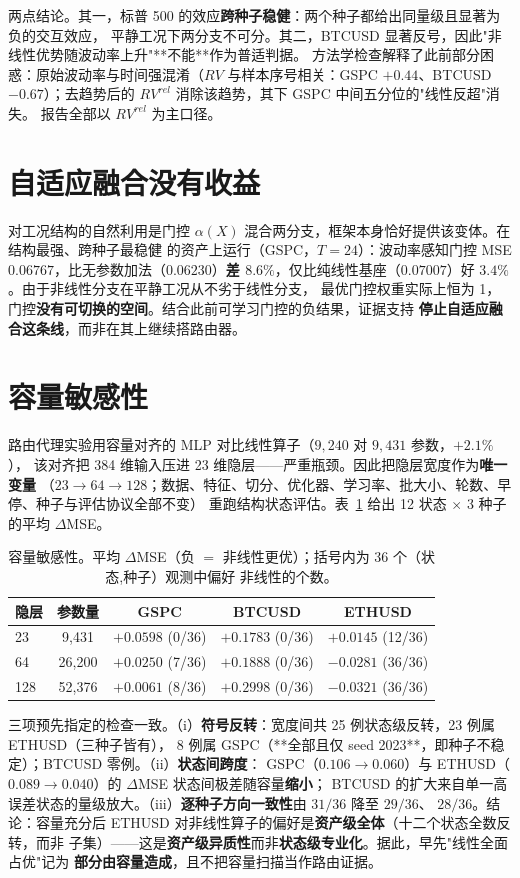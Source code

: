 \documentclass[conference]{IEEEtran}
\begin{document}
两点结论。其一，标普 500 的效应\textbf{跨种子稳健}：两个种子都给出同量级且显著为负的交互效应，
平静工况下两分支不可分。其二，BTCUSD 显著反号，因此"非线性优势随波动率上升"**不能**作为普适判据。
方法学检查解释了此前部分困惑：原始波动率与时间强混淆（$RV$ 与样本序号相关：GSPC $+0.44$、BTCUSD
$-0.67$）；去趋势后的 $RV^{rel}$ 消除该趋势，其下 GSPC 中间五分位的"线性反超"消失。
报告全部以 $RV^{rel}$ 为主口径。

\section{自适应融合没有收益}
对工况结构的自然利用是门控 $\alpha(X)$ 混合两分支，框架本身恰好提供该变体。在结构最强、跨种子最稳健
的资产上运行（GSPC，$T=24$）：波动率感知门控 MSE $0.06767$，比无参数加法（$0.06230$）\textbf{差
$8.6\%$}，仅比纯线性基座（$0.07007$）好 $3.4\%$。由于非线性分支在平静工况从不劣于线性分支，
最优门控权重实际上恒为 1，门控\textbf{没有可切换的空间}。结合此前可学习门控的负结果，证据支持
\textbf{停止自适应融合这条线}，而非在其上继续搭路由器。

\section{容量敏感性}
路由代理实验用容量对齐的 MLP 对比线性算子（$9{,}240$ 对 $9{,}431$ 参数，$+2.1\%$），
该对齐把 384 维输入压进 23 维隐层——严重瓶颈。因此把隐层宽度作为\textbf{唯一变量}
（$23\to64\to128$；数据、特征、切分、优化器、学习率、批大小、轮数、早停、种子与评估协议全部不变）
重跑结构状态评估。表~\ref{tab:cap} 给出 12 状态 $\times$ 3 种子的平均 $\Delta$MSE。

\begin{table}[!t]
\caption{容量敏感性。平均 $\Delta$MSE（负 $=$ 非线性更优）；括号内为 36 个（状态,种子）观测中偏好
非线性的个数。}
\label{tab:cap}
\centering
\small
\begin{tabular}{@{}lcccc@{}}
\toprule
隐层 & 参数量 & GSPC & BTCUSD & ETHUSD \\
\midrule
23  & 9{,}431  & $+0.0598$ (0/36) & $+0.1783$ (0/36) & $+0.0145$ (12/36) \\
64  & 26{,}200 & $+0.0250$ (7/36) & $+0.1888$ (0/36) & $\mathbf{-0.0281}$ (36/36) \\
128 & 52{,}376 & $+0.0061$ (8/36) & $+0.2998$ (0/36) & $\mathbf{-0.0321}$ (36/36) \\
\bottomrule
\end{tabular}
\end{table}

三项预先指定的检查一致。（i）\textbf{符号反转}：宽度间共 25 例状态级反转，23 例属 ETHUSD（三种子皆有），
8 例属 GSPC（**全部且仅 seed 2023**，即种子不稳定）；BTCUSD 零例。（ii）\textbf{状态间跨度}：
GSPC（$0.106\to0.060$）与 ETHUSD（$0.089\to0.040$）的 $\Delta$MSE 状态间极差随容量\textbf{缩小}；
BTCUSD 的扩大来自单一高误差状态的量级放大。（iii）\textbf{逐种子方向一致性}由 $31/36$ 降至 $29/36$、
$28/36$。结论：容量充分后 ETHUSD 对非线性算子的偏好是\textbf{资产级全体}（十二个状态全数反转，而非
子集）——这是\textbf{资产级异质性}而非\textbf{状态级专业化}。据此，早先"线性全面占优"记为
\textbf{部分由容量造成}，且不把容量扫描当作路由证据。
\end{document}
